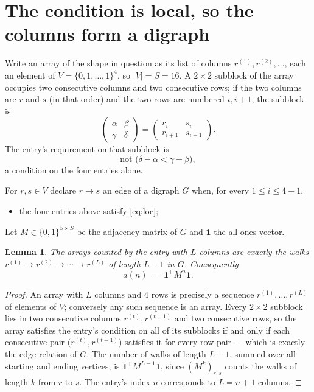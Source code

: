 \documentclass[11pt,a4paper]{article}
\theoremstyle{plain}
\newtheorem{lemma}[theorem]{Lemma}
\theoremstyle{definition}
\begin{document}
\section{The condition is local, so the columns form a digraph}

Write an array of the shape in question as its list of columns
$r^{(1)},r^{(2)},\dots$, each an element of
$V=\{0,1,\dots,1\}^{4}$, so $|V|=S=16$. A $2\times2$ subblock of the array
occupies two consecutive columns and two consecutive rows; if the two columns are $r$
and $s$ (in that order) and the two rows are numbered $i,i+1$,
the subblock is
\[
\begin{pmatrix}\alpha&\beta\\\gamma&\delta\end{pmatrix}=\begin{pmatrix}r_i&s_i\\r_{i+1}&s_{i+1}\end{pmatrix}.
\]
The entry's requirement on that subblock is
\begin{equation}\label{eq:loc}
\text{not }\bigl(\delta-\alpha<\gamma-\beta\bigr),
\end{equation}
a condition on the four entries alone.

For $r,s\in V$ declare $r\to s$ an edge of a digraph $G$ when, for every
$1\le i\le 4-1$,
\begin{itemize}
\item the four entries above satisfy \eqref{eq:loc};

\end{itemize}
Let $M\in\{0,1\}^{S\times S}$ be the adjacency matrix of $G$ and $\mathbf{1}$ the
all-ones vector.

\begin{lemma}\label{lem:walk}
The arrays counted by the entry with $L$ columns are exactly the walks
$r^{(1)}\to r^{(2)}\to\cdots\to r^{(L)}$ of length $L-1$ in $G$. Consequently
\[
a(n)\;=\;\mathbf{1}^{\!\top}M^{n}\mathbf{1} .
\]
\end{lemma}

\begin{proof}
An array with $L$ columns and $4$ rows is precisely a sequence
$r^{(1)},\dots,r^{(L)}$ of elements of $V$; conversely any such sequence is an array.
Every $2\times2$ subblock lies in two consecutive columns $r^{(t)},r^{(t+1)}$ and two
consecutive rows, so the array satisfies the entry's condition on all of its subblocks
if and only if each consecutive pair $\bigl(r^{(t)},r^{(t+1)}\bigr)$ satisfies it for
every row pair --- which is exactly the edge relation of $G$. The number of walks of
length $L-1$, summed over all starting and ending vertices, is
$\mathbf{1}^{\!\top}M^{L-1}\mathbf{1}$, since $(M^{k})_{r,s}$ counts the walks of
length $k$ from $r$ to $s$. The entry's index $n$ corresponds to $L=n+1$ columns.
\end{proof}
\end{document}
